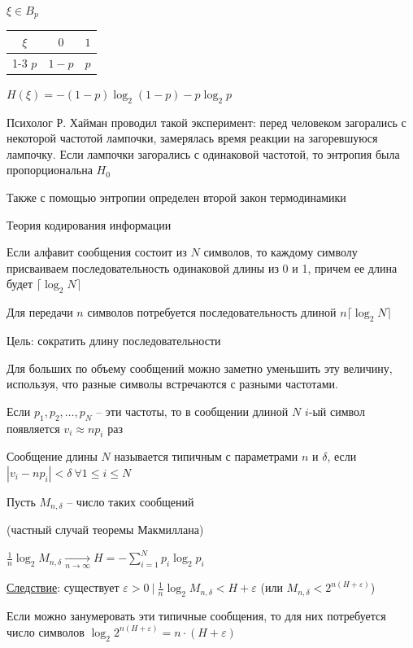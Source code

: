 \Ex $\xi \in B_{p}$

\begin{tabular}{c|c|c}
    $\xi$ & $0$ & $1$ \\
    \cline{1-3}
    $p$   & $1 - p$ & $p$
\end{tabular}

$H(\xi) = -(1 - p) \log_2 (1 - p) - p \log_2 p$


 Психолог Р. Хайман проводил такой эксперимент: перед человеком загорались с некоторой частотой лампочки, замерялась время реакции на загоревшуюся лампочку. 
Если лампочки загорались с одинаковой частотой, то энтропия была пропорциональна $H_0$

 Также с помощью энтропии определен второй закон термодинамики

 Теория кодирования информации

Если алфавит сообщения состоит из $N$ символов, то каждому символу присваиваем последовательность одинаковой длины из 0 и 1, 
причем ее длина будет $\lceil\log_2 N\rceil$

Для передачи $n$ символов потребуется последовательность длиной $n\lceil\log_2 N\rceil$

Цель: сократить длину последовательности

Для больших по объему сообщений можно заметно уменьшить эту величину, используя, что разные символы встречаются с разными частотами.

Если $p_1, p_2, \dots, p_N$ -- эти частоты, то в сообщении длиной $N$ $i$-ый символ появляется $v_i \approx n p_i$ раз 

\Def Сообщение длины $N$ называется типичным с параметрами $n$ и $\delta$, если $|v_i - n p_i| < \delta \ \forall 1 \leq i \leq N$

Пусть $M_{n, \delta}$ -- число таких сообщений

\begin{MyTheorem}
    \Ths (частный случай теоремы Макмиллана)

    $\frac{1}{n} \log_2 M_{n, \delta} \underset{n \to \infty}{\longrightarrow} H = -\sum_{i = 1}^N p_i \log_2 p_i$
\end{MyTheorem}

\underline{Следствие}: существует $\varepsilon > 0 \ | \ \frac{1}{n} \log_2 M_{n,\delta} < H + \varepsilon$ (или $M_{n, \delta} < 2^{n(H + \varepsilon)}$)

Если можно занумеровать эти типичные сообщения, то для них потребуется число символов $\log_2 2^{n(H + \varepsilon)} = n \cdot (H + \varepsilon)$


